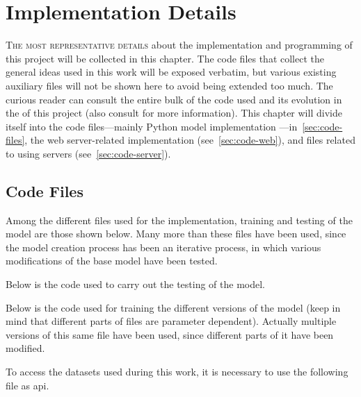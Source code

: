 

\chapter{Implementation Details}\label{cha:code}


\lettrine{T}{he most representative details} about the implementation and
programming of this project will be collected in this chapter. The code files
that collect the general ideas used in this work will be exposed verbatim, but
various existing auxiliary files will not be shown here to avoid being extended
too much. The curious reader can consult the entire bulk of the code used and
its evolution in the
 of this project (also consult
 for more information). This chapter
will divide itself into the code files---mainly Python model implementation
---in\ \vref{sec:code-files}, the web server-related implementation (see\
\vref{sec:code-web}), and files related to using servers (see\
\vref{sec:code-server}).


\section{Code Files}\label{sec:code-files}

Among the different files used for the implementation, training and testing of
the model are those shown below. Many more than these files have been used,
since the model creation process has been an iterative process, in which
various modifications of the base model have been tested.

Below is the code used to carry out the testing of the model.


Below is the code used for training the different versions of the model (keep
in mind that different parts of files are parameter dependent). Actually
multiple versions of this same file have been used, since different parts of it
have been modified.


To access the datasets used during this work, it is necessary to use the
following file as \gls{api}.


